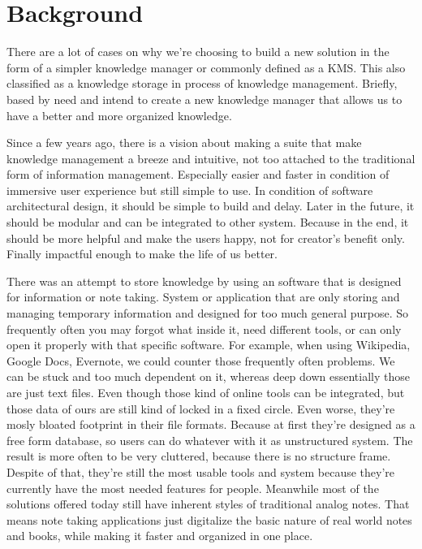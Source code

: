 \section{Background}
\label{sec:background}

There are a lot of cases on why we're choosing to build a new solution in the form of a simpler knowledge manager or commonly defined as a \ac{KMS}.
This also classified as a knowledge storage in process of knowledge management.
Briefly, based by need and intend to create a new knowledge manager that allows us to have a better and more organized knowledge.

Since a few years ago, there is a vision about making a suite that make knowledge management a breeze and intuitive, not too attached to the traditional form of information management.
Especially easier and faster in condition of immersive user experience but still simple to use.
In condition of software architectural design, it should be simple to build and delay.
Later in the future, it should be modular and can be integrated to other system.
Because in the end, it should be more helpful and make the users happy, not for creator's benefit only.
Finally impactful enough to make the life of us better.

There was an attempt to store knowledge by using an software that is designed for information or note taking. System or application that are only storing and managing temporary information and designed for too much general purpose.
So frequently often you may forgot what inside it, need different tools, or can only open it properly with that specific software.
For example, when using Wikipedia, Google Docs, Evernote, we could counter those frequently often problems.
We can be stuck and too much dependent on it, whereas deep down essentially those are just text files.
Even though those kind of online tools can be integrated, but those data of ours are still kind of locked in a fixed circle.
Even worse, they're mosly bloated footprint in their file formats.
Because at first they're designed as a free form database, so users can do whatever with it as unstructured system.
The result is more often to be very cluttered, because there is no structure frame.
Despite of that, they're still the most usable tools and system because they're currently have the most needed features for people.
Meanwhile most of the solutions offered today still have inherent styles of traditional analog notes.
That means note taking applications just digitalize the basic nature of real world notes and books, while making it faster and organized in one place.

